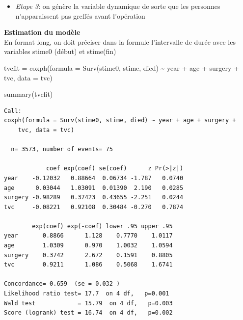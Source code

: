 \documentclass[
  12pt,
  letterpaper,
  DIV=11,
  numbers=noendperiod,
  onepage,
  openany]{scrreprt}
\newenvironment{Shaded}{\begin{snugshade}}{\end{snugshade}}
\newcommand{\AttributeTok}[1]{\textcolor[rgb]{0.80,0.80,0.80}{#1}}
\newcommand{\DecValTok}[1]{\textcolor[rgb]{0.86,0.86,0.80}{#1}}
\newcommand{\FunctionTok}[1]{\textcolor[rgb]{0.94,0.94,0.56}{#1}}
\newcommand{\NormalTok}[1]{\textcolor[rgb]{0.80,0.80,0.80}{#1}}
\newcommand{\OtherTok}[1]{\textcolor[rgb]{0.94,0.94,0.56}{#1}}
\newcommand{\SpecialCharTok}[1]{\textcolor[rgb]{0.86,0.64,0.64}{#1}}
\providecommand{\tightlist}{%
  \setlength{\itemsep}{0pt}\setlength{\parskip}{0pt}}\usepackage{longtable,booktabs,array}
\begin{document}
\begin{itemize}
\tightlist
\item
  \emph{Etape 3}: on génère la variable dynamique de sorte que les
  personnes n'apparaissent pas greffés avant l'opération
\end{itemize}

\begin{Shaded}
\end{Shaded}

\textbf{Estimation du modèle}\\
En format long, on doit préciser dans la formule l'intervalle de durée
avec les variables stime0 (début) et stime(fin)

\begin{Shaded}
\begin{Highlighting}[]
\NormalTok{tvcfit }\OtherTok{=} \FunctionTok{coxph}\NormalTok{(}\AttributeTok{formula =} \FunctionTok{Surv}\NormalTok{(stime0, stime, died) }\SpecialCharTok{\textasciitilde{}}\NormalTok{ year }\SpecialCharTok{+}\NormalTok{ age }\SpecialCharTok{+}\NormalTok{ surgery }\SpecialCharTok{+}\NormalTok{ tvc, }\AttributeTok{data =}\NormalTok{ tvc)}

\FunctionTok{summary}\NormalTok{(tvcfit)}
\end{Highlighting}
\end{Shaded}

\begin{verbatim}
Call:
coxph(formula = Surv(stime0, stime, died) ~ year + age + surgery + 
    tvc, data = tvc)

  n= 3573, number of events= 75 

            coef exp(coef) se(coef)      z Pr(>|z|)
year    -0.12032   0.88664  0.06734 -1.787   0.0740
age      0.03044   1.03091  0.01390  2.190   0.0285
surgery -0.98289   0.37423  0.43655 -2.251   0.0244
tvc     -0.08221   0.92108  0.30484 -0.270   0.7874

        exp(coef) exp(-coef) lower .95 upper .95
year       0.8866      1.128    0.7770    1.0117
age        1.0309      0.970    1.0032    1.0594
surgery    0.3742      2.672    0.1591    0.8805
tvc        0.9211      1.086    0.5068    1.6741

Concordance= 0.659  (se = 0.032 )
Likelihood ratio test= 17.7  on 4 df,   p=0.001
Wald test            = 15.79  on 4 df,   p=0.003
Score (logrank) test = 16.74  on 4 df,   p=0.002
\end{verbatim}
\end{document}
